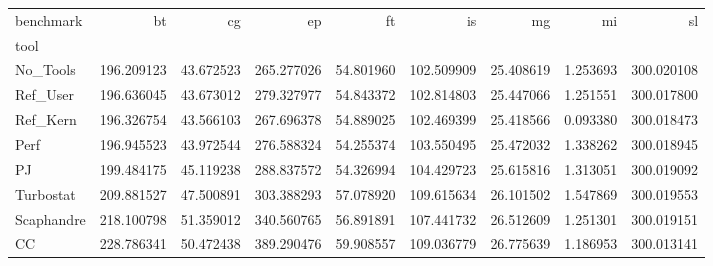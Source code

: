 \begin{tabular}{lrrrrrrrr}
\toprule
benchmark & bt & cg & ep & ft & is & mg & mi & sl \\
tool &  &  &  &  &  &  &  &  \\
\midrule
No_Tools & 196.209123 & 43.672523 & 265.277026 & 54.801960 & 102.509909 & 25.408619 & 1.253693 & 300.020108 \\
Ref_User & 196.636045 & 43.673012 & 279.327977 & 54.843372 & 102.814803 & 25.447066 & 1.251551 & 300.017800 \\
Ref_Kern & 196.326754 & 43.566103 & 267.696378 & 54.889025 & 102.469399 & 25.418566 & 0.093380 & 300.018473 \\
Perf & 196.945523 & 43.972544 & 276.588324 & 54.255374 & 103.550495 & 25.472032 & 1.338262 & 300.018945 \\
PJ & 199.484175 & 45.119238 & 288.837572 & 54.326994 & 104.429723 & 25.615816 & 1.313051 & 300.019092 \\
Turbostat & 209.881527 & 47.500891 & 303.388293 & 57.078920 & 109.615634 & 26.101502 & 1.547869 & 300.019553 \\
Scaphandre & 218.100798 & 51.359012 & 340.560765 & 56.891891 & 107.441732 & 26.512609 & 1.251301 & 300.019151 \\
CC & 228.786341 & 50.472438 & 389.290476 & 59.908557 & 109.036779 & 26.775639 & 1.186953 & 300.013141 \\
\bottomrule
\end{tabular}
